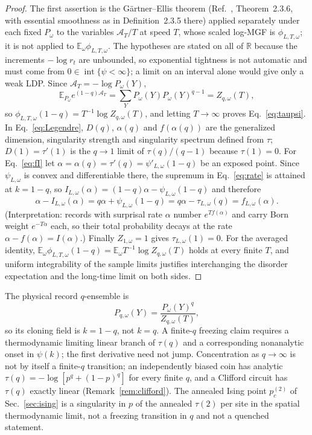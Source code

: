 \documentclass[aps,prx,reprint,superscriptaddress,nobibnotes,longbibliography]{revtex4-2}
\theoremstyle{remark}
\newcommand{\E}{\mathbb E}
\begin{document}
\begin{proof}
The first assertion is the G\"artner--Ellis theorem (Ref.~\cite{DemboZeitouni1998}, Theorem~2.3.6, with essential smoothness as in Definition~2.3.5 there) applied separately under each fixed $P_\omega$ to the variables $\mathcal A_T/T$ at speed $T$, whose scaled log-MGF is $\phi_{L,T,\omega}$; it is not applied to $\E_\omega\phi_{L,T,\omega}$.  The hypotheses are stated on all of $\mathbb R$ because the increments $-\log r_t$ are unbounded, so exponential tightness is not automatic and must come from $0\in\operatorname{int}\{\psi<\infty\}$; a limit on an interval alone would give only a weak LDP.  Since $\mathcal A_T=-\log P_\omega(Y)$,
\begin{equation}
 \E_{P_\omega}e^{(1-q)\mathcal A_T}
 =\sum_Y P_\omega(Y)P_\omega(Y)^{q-1}=Z_{q,\omega}(T),
\end{equation}
so $\phi_{L,T,\omega}(1-q)=T^{-1}\log Z_{q,\omega}(T)$, and letting $T\to\infty$ proves Eq.~\eqref{eq:taupsi}.  In Eq.~\eqref{eq:Legendre}, $D(q)$, $\alpha(q)$ and $f(\alpha(q))$ are the generalized dimension, singularity strength and singularity spectrum defined from $\tau$; $D(1)=\tau'(1)$ is the $q\to1$ limit of $\tau(q)/(q-1)$ because $\tau(1)=0$.  For Eq.~\eqref{eq:fI} let $\alpha=\alpha(q)=\tau'(q)=\psi'_{L,\omega}(1-q)$ be an exposed point.  Since $\psi_{L,\omega}$ is convex and differentiable there, the supremum in Eq.~\eqref{eq:rate} is attained at $k=1-q$, so $I_{L,\omega}(\alpha)=(1-q)\alpha-\psi_{L,\omega}(1-q)$ and therefore
\begin{equation*}
 \alpha-I_{L,\omega}(\alpha)=q\alpha+\psi_{L,\omega}(1-q)=q\alpha-\tau_{L,\omega}(q)=f_{L,\omega}(\alpha).
\end{equation*}
(Interpretation: records with surprisal rate $\alpha$ number $e^{Tf(\alpha)}$ and carry Born weight $e^{-T\alpha}$ each, so their total probability decays at the rate $\alpha-f(\alpha)=I(\alpha)$.)  Finally $Z_{1,\omega}=1$ gives $\tau_{L,\omega}(1)=0$.  For the averaged identity, $\E_\omega\phi_{L,T,\omega}(1-q)=\E_\omega T^{-1}\log Z_{q,\omega}(T)$ holds at every finite $T$, and uniform integrability of the sample limits justifies interchanging the disorder expectation and the long-time limit on both sides.
\end{proof}

The physical record $q$-ensemble is
\begin{equation}
 P_{q,\omega}(Y)=\frac{P_\omega(Y)^q}{Z_{q,\omega}(T)},
\end{equation}
so its cloning field is $k=1-q$, not $k=q$.  A finite-$q$ freezing claim requires a thermodynamic limiting linear branch of $\tau(q)$ and a corresponding nonanalytic onset in $\psi(k)$; the first derivative need not jump.  Concentration as $q\to\infty$ is not by itself a finite-$q$ transition; an independently biased coin has analytic $\tau(q)=-\log[p^q+(1-p)^q]$ for every finite $q$, and a Clifford circuit has $\tau(q)$ exactly linear (Remark~\ref{rem:clifford}).  The annealed Ising point $p_c^{(2)}$ of Sec.~\ref{sec:ising} is a singularity in $p$ of the annealed $\tau(2)$ per site in the spatial thermodynamic limit, not a freezing transition in $q$ and not a quenched statement.
\end{document}

